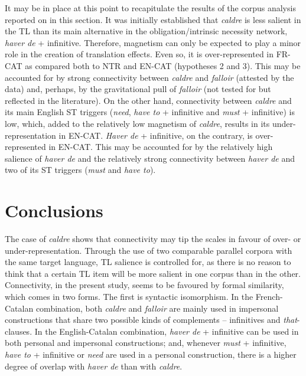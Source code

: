 \documentclass[output=paper,english,spanish,german,english]{langsci/langscibook}
\begin{document}
It may be in place at this point to recapitulate the results of the corpus analysis reported on in this section. It was initially established that \textit{caldre} is less salient in the TL than its main alternative in the obligation/intrinsic necessity network, \textit{haver de} + infinitive. Therefore, magnetism can only be expected to play a minor role in the creation of translation effects. Even so, it is over-represented in FR-CAT as compared both to NTR and EN-CAT (hypotheses 2 and 3). This may be accounted for by strong connectivity between \textit{caldre} and \textit{falloir} (attested by the data) and, perhaps, by the gravitational pull of \textit{falloir} (not tested for but reflected in the literature). On the other hand, connectivity between \textit{caldre} and its main English ST triggers (\textit{need}, \textit{have to} + infinitive and \textit{must} + infinitive) is low, which, added to the relatively low magnetism of \textit{caldre}, results in its under-representation in EN-CAT. \textit{Haver de} + infinitive, on the contrary, is over-represented in EN-CAT. This may be accounted for by the relatively high salience of \textit{haver de} and the relatively strong connectivity between \textit{haver de }and two of its ST triggers (\textit{must} and \textit{have to}).

\section{Conclusions}\label{conc}

The case of \textit{caldre} shows that connectivity may tip the scales in favour of over- or under-representation. Through the use of two comparable parallel corpora with the same target language, TL salience is controlled for, as there is no reason to think that a certain TL item will be more salient in one corpus than in the other. Connectivity, in the present study, seems to be favoured by formal similarity, which comes in two forms. The first is syntactic isomorphism. In the French-Catalan combination, both \textit{caldre} and \textit{falloir} are mainly used in impersonal constructions that share two possible kinds of complements -- infinitives and \textit{that}-clauses. In the English-Catalan combination, \textit{haver de} + infinitive can be used in both personal and impersonal constructions; and, whenever \textit{must} + infinitive, \textit{have to} + infinitive or \textit{need} are used in a personal construction, there is a higher degree of overlap with \textit{haver de} than with \textit{caldre}.
\end{document}
